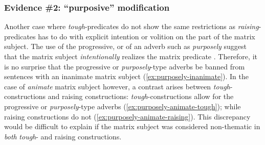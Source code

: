 \documentclass[11pt]{article}
\begin{document}
\subsubsection{Evidence \#2: ``purposive'' modification}
Another case where \textit{tough}-predicates do not show the same restrictions as \textit{raising}-predicates has to do with explicit intention or volition on the part of the matrix subject. The use of the progressive, or of an adverb such as \textit{purposely} suggest that the matrix subject \textit{intentionally} realizes the matrix predicate \cite{Lasnik1974,Hukari1990}. Therefore, it is no surprise that the progressive or \textit{purposely}-type adverbs be banned from sentences with an inanimate matrix subject (\ref{ex:purposely-inanimate}). In the case of \textit{animate} matrix subject however, a contrast arises between \textit{tough}-constructions and raising constructions: \textit{tough}-constructions allow for the progressive or \textit{purposely}-type adverbs (\ref{ex:purposely-animate-tough}); while raising constructions do not (\ref{ex:purposely-animate-raising}). This discrepancy would be difficult to explain if the matrix subject was considered non-thematic in \textit{both} \textit{tough}- and raising constructions.
\begin{exe}
	\ex 
	\begin{xlist}
	\end{xlist}\label{ex:purposely-inanimate}
	\ex
	\begin{xlist}
		\label{ex:purposely-animate-tough}
		\label{ex:purposely-animate-raising}
	\end{xlist}
\end{exe}
\end{document}
